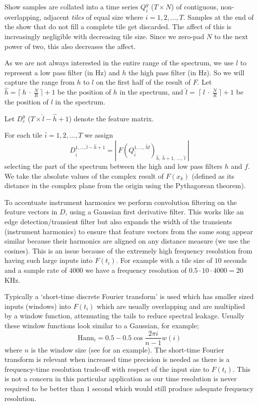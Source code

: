 \documentclass[twocolumn]{article}
\begin{document}
	Show samples are collated into a time series $Q_i^y$ ($T \times N$) of contiguous, non-overlapping, adjacent \emph{tiles} of equal size where $i=1,2,\ldots, T$. Samples at the end of the show that do not fill a complete tile get discarded. The affect of this is increasingly negligible with decreasing tile size. Since we zero-pad $N$ to the next power of two, this also decreases the affect.
	
	As we are not always interested in the entire range of the spectrum, we use $l$ to represent a low pass filter (in Hz) and $h$ the high pass filter (in Hz). So we will capture the range from $h$ to $l$ on the first half of the result of $F$. Let $\hat{h} = \lceil~h~\cdot~\frac{{N}}{R} ~\rceil+1$ be the position of $h$ in the spectrum, and $\hat l=~\lceil~l~\cdot~\frac{{N}}{R}~\rceil+1$ be the position of $l$ in the spectrum.
	
	Let $D_e^y$ ($T \times \hat{l}-\hat{h}+1$) denote the feature matrix.
	
	For each tile $\bar{i}=1,2,\ldots,T$ we assign 
\[
D_{\bar{i}}^{1,\ldots,\hat{l}-\hat{h}+1} = \left|~F(Q_{\bar{i}}^{1,\ldots,\tilde{M}})_{\hat{h},~\hat{h}+1,~\ldots,~\hat{l} }~\right|
\]
 selecting the part of the spectrum between the high and low pass filters $h$ and $f$.  We take the absolute values of the complex result of $F(x_k)$ (defined as its distance in the complex plane from the origin using the Pythagorean theorem).
	
	To accentuate instrument harmonics we perform convolution filtering on the feature vectors in $D$, using a Gaussian first derivative filter. This works like an edge detection/transient filter but also expands the width of the transients (instrument harmonics) to ensure that feature vectors from the same song appear similar because their harmonics are aligned on any distance measure (we use the cosines). This is an issue because of the extremely high frequency resolution from having such large inputs into $F(t_i)$. For example with a tile size of $10$ seconds and a sample rate of $4000$ we have a frequency resolution of $0.5 \cdot 10 \cdot 4000 = 20$KHz. 
	
	Typically a `short-time discrete Fourier transform' is used which has smaller sized inputs (windows) into $F(t_i)$ which are usually overlapping and are multiplied by a window function, attenuating the tails to reduce spectral leakage. Usually these window functions look similar to a Gaussian, for example;  
	\[
	\mathrm{Hann}_i = 0.5 - 0.5 \cos\frac{2\pi i}{n-1}{w(i)}
	\] where $n$ is the window size
	(see \cite{tzanetakis1999multifeature} for an example). The short-time Fourier transform is relevant when increased time precision is needed as there is a frequency-time resolution trade-off with respect of the input size to $F(t_i)$. This is not a concern in this particular application as our time resolution is never required to be better than $1$ second which would still produce adequate frequency resolution.
	
\end{document}

